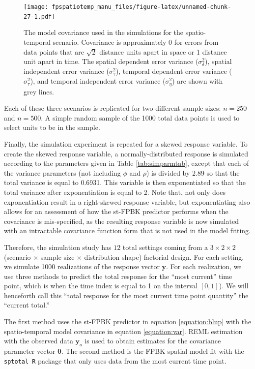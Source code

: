 \documentclass[]{interact}
\theoremstyle{plain}%
\theoremstyle{definition}
\theoremstyle{remark}
\begin{document}
\begin{figure}
\centering
\texttt{[image: fpspatiotemp\_manu\_files/figure-latex/unnamed-chunk-27-1.pdf]}
\caption{\label{fig:simcovplot} The model covariance used in the
simulations for the spatio-temporal scenario. Covariance is
approximately 0 for errors from data points that are \(\sqrt2\) distance
units apart in space or 1 distance unit apart in time. The spatial
dependent error variance (\(\sigma^2_{\delta}\)), spatial independent
error variance (\(\sigma^2_{\gamma}\)), temporal dependent error
variance (\(\sigma^2_{\tau}\)), and temporal independent error variance
(\(\sigma^2_{\eta}\)) are shown with grey lines.}
\end{figure}

Each of these three scenarios is replicated for two different sample
sizes: \(n = 250\) and \(n = 500\). A simple random sample of the 1000
total data points is used to select units to be in the sample.

Finally, the simulation experiment is repeated for a skewed response
variable. To create the skewed response variable, a normally-distributed
response is simulated according to the parameters given in Table
\ref{tab:simparmtab}, except that each of the variance parameters (not
including \(\phi\) and \(\rho\)) is divided by 2.89 so that the total
variance is equal to 0.6931. This variable is then exponentiated so that
the total variance after exponentiation is equal to 2. Note that, not
only does exponentiation result in a right-skewed response variable, but
exponentiating also allows for an assessment of how the st-FPBK
predictor performs when the covariance is mis-specified, as the
resulting response variable is now simulated with an intractable
covariance function form that is not used in the model fitting.

Therefore, the simulation study has \(12\) total settings coming from a
\(3 \times 2 \times 2\) (scenario \(\times\) sample size \(\times\)
distribution shape) factorial design. For each setting, we simulate 1000
realizations of the response vector \(\mathbf{y}\). For each
realization, we use three methods to predict the total response for the
``most current'' time point, which is when the time index is equal to 1
on the interval \([0, 1]\)). We will henceforth call this ``total
response for the most current time point quantity'' the ``current
total.''

The first method uses the st-FPBK predictor in equation
\ref{equation:blup} with the spatio-temporal model covariance in
equation \ref{equation:var}. REML estimation with the observed data
\(\mathbf{y}_o\) is used to obtain estimates for the covariance
parameter vector \(\bm{\theta}\). The second method is the FPBK spatial
model fit with the \texttt{sptotal R} package \citep{higham2021sptotal}
that only uses data from the most current time point.
\end{document}
